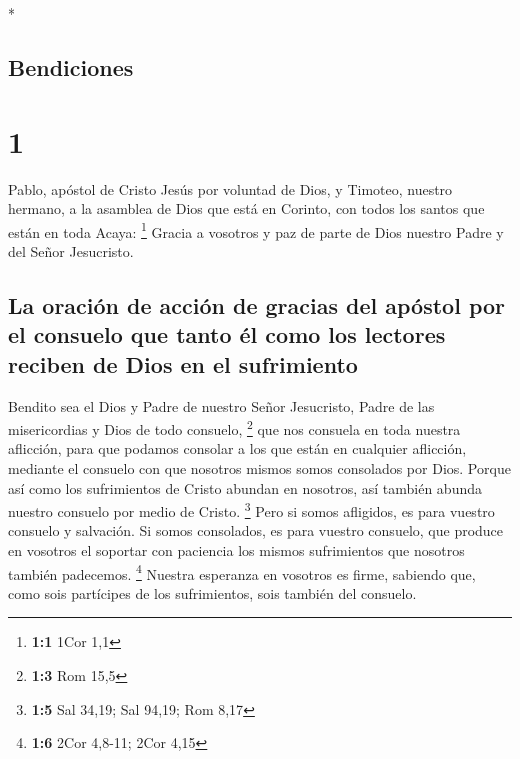 \begin{paracol}{2} \switchcolumn[0]*

\hypertarget{bendiciones}{%
\subsection{Bendiciones}\label{bendiciones}}

\hypertarget{section}{%
\section{1}\label{section}}

 Pablo, apóstol de Cristo Jesús por voluntad de Dios, y
Timoteo, nuestro hermano, a la asamblea de Dios que está en Corinto, con
todos los santos que están en toda Acaya: \footnote{\textbf{1:1} 1Cor
  1,1}  Gracia a vosotros y paz de parte de Dios nuestro
Padre y del Señor Jesucristo.

\hypertarget{la-oraciuxf3n-de-acciuxf3n-de-gracias-del-apuxf3stol-por-el-consuelo-que-tanto-uxe9l-como-los-lectores-reciben-de-dios-en-el-sufrimiento}{%
\subsection{La oración de acción de gracias del apóstol por el consuelo
que tanto él como los lectores reciben de Dios en el
sufrimiento}\label{la-oraciuxf3n-de-acciuxf3n-de-gracias-del-apuxf3stol-por-el-consuelo-que-tanto-uxe9l-como-los-lectores-reciben-de-dios-en-el-sufrimiento}}

 Bendito sea el Dios y Padre de nuestro Señor Jesucristo,
Padre de las misericordias y Dios de todo consuelo, \footnote{\textbf{1:3}
  Rom 15,5}  que nos consuela en toda nuestra aflicción,
para que podamos consolar a los que están en cualquier aflicción,
mediante el consuelo con que nosotros mismos somos consolados por Dios.
 Porque así como los sufrimientos de Cristo abundan en
nosotros, así también abunda nuestro consuelo por medio de Cristo.
\footnote{\textbf{1:5} Sal 34,19; Sal 94,19; Rom 8,17} 
Pero si somos afligidos, es para vuestro consuelo y salvación. Si somos
consolados, es para vuestro consuelo, que produce en vosotros el
soportar con paciencia los mismos sufrimientos que nosotros también
padecemos. \footnote{\textbf{1:6} 2Cor 4,8-11; 2Cor 4,15} 
Nuestra esperanza en vosotros es firme, sabiendo que, como sois
partícipes de los sufrimientos, sois también del consuelo.


\end{paracol}
